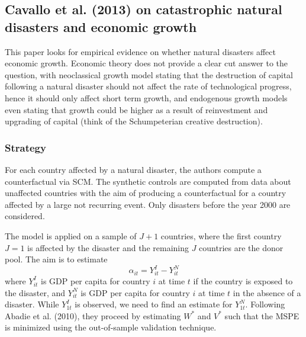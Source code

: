 \documentclass[12pt,a4paper,draft]{article}
\begin{document}
\subsection{Cavallo et al. (2013) on catastrophic natural disasters and economic growth}
This paper looks for empirical evidence on whether natural disasters affect economic growth.
Economic theory does not provide a clear cut answer to the question, with neoclassical 
growth model stating that the destruction of capital following a natural disaster should 
not affect the rate of technological progress, hence it should only affect short term 
growth, and endogenous growth models even stating that growth could be higher as a result 
of reinvestment and upgrading of capital (think of the Schumpeterian creative destruction).

\subsubsection*{Strategy}
For each country affected by a natural disaster, the authors compute a counterfactual 
via SCM. The synthetic controls are computed from data about unaffected countries with 
the aim of producing a counterfactual for a country affected by a large not recurring 
event. Only disasters before the year 2000 are considered.

The model is applied on a sample of $J+1$ countries, where the first country $J=1$ is 
affected by the disaster and the remaining $J$ countries are the donor pool. The aim is 
to estimate $$\alpha_{it} = Y^I_{it} - Y^N_{it}$$ where $Y^I_{it}$ is GDP per capita 
for country $i$ at time $t$ if the country is exposed to the disaster, and $Y^N_{it}$ 
is GDP per capita for country $i$ at time $t$ in the absence of a disaster. 
While $Y^I_{1t}$ is observed, we need to find an estimate for $Y^N_{1t}$. 
Following Abadie et al. (2010), they proceed by estimating $W^*$ and $V^*$ such that 
the MSPE is minimized using the out-of-sample validation technique. 
\end{document}
